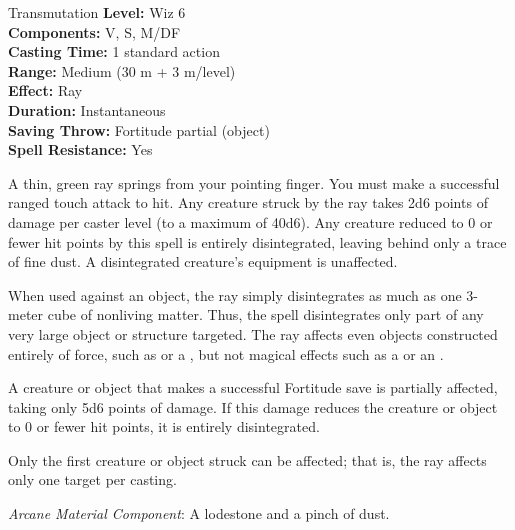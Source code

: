 {Transmutation}
{
	\textbf{Level:}
	Wiz 6\\
	\textbf{Components:}
	V, S, M/DF\\
	\textbf{Casting Time:}
	1 standard action\\
	\textbf{Range:}
	Medium (30 m + 3 m/level)\\
	\textbf{Effect:}
	Ray\\
	\textbf{Duration:}
	Instantaneous\\
	\textbf{Saving Throw:}
	Fortitude partial (object)\\
	\textbf{Spell Resistance:}
	Yes\\
}
{
	A thin, green ray springs from your pointing finger. You must make a successful ranged touch attack to hit. Any creature struck by the ray takes 2d6 points of damage per caster level (to a maximum of 40d6). Any creature reduced to 0 or fewer hit points by this spell is entirely disintegrated, leaving behind only a trace of fine dust. A disintegrated creature's equipment is unaffected.

	When used against an object, the ray simply disintegrates as much as one 3-meter cube of nonliving matter. Thus, the spell disintegrates only part of any very large object or structure targeted. The ray affects even objects constructed entirely of force, such as  or a , but not magical effects such as a  or an .

	A creature or object that makes a successful Fortitude save is partially affected, taking only 5d6 points of damage. If this damage reduces the creature or object to 0 or fewer hit points, it is entirely disintegrated.

	Only the first creature or object struck can be affected; that is, the ray affects only one target per casting.

	\textit{Arcane Material Component}:
	A lodestone and a pinch of dust.

}
